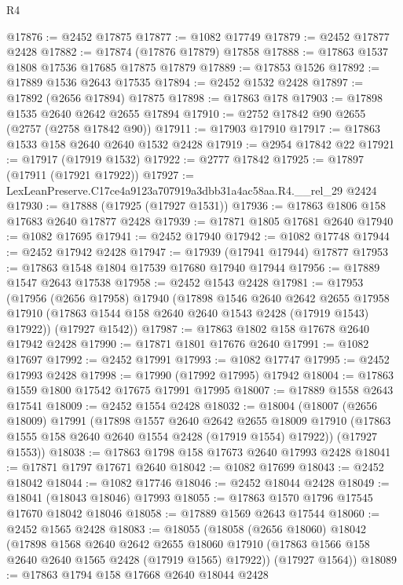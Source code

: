 \begin{lexlean}{R4}
\begin{coremodule}
@17876 := @2452 @17875
@17877 := @1082 @17749
@17879 := @2452 @17877 @2428
@17882 := @17874 (@17876 @17879) @17858
@17888 := @17863 @1537 @1808 @17536 @17685 @17875 @17879
@17889 := @17853 @1526
@17892 := @17889 @1536 @2643 @17535
@17894 := @2452 @1532 @2428
@17897 := @17892 (@2656 @17894) @17875
@17898 := @17863 @178
@17903 := @17898 @1535 @2640 @2642 @2655 @17894
@17910 := @2752 @17842 @90 @2655 (@2757 (@2758 @17842 @90))
@17911 := @17903 @17910
@17917 := @17863 @1533 @158 @2640 @2640 @1532 @2428
@17919 := @2954 @17842 @22
@17921 := @17917 (@17919 @1532)
@17922 := @2777 @17842
@17925 := @17897 (@17911 (@17921 @17922))
@17927 := LexLeanPreserve.C17ce4a9123a707919a3dbb31a4ac58aa.R4.__rel_29 @2424
@17930 := @17888 (@17925 (@17927 @1531))
@17936 := @17863 @1806 @158 @17683 @2640 @17877 @2428
@17939 := @17871 @1805 @17681 @2640
@17940 := @1082 @17695
@17941 := @2452 @17940
@17942 := @1082 @17748
@17944 := @2452 @17942 @2428
@17947 := @17939 (@17941 @17944) @17877
@17953 := @17863 @1548 @1804 @17539 @17680 @17940 @17944
@17956 := @17889 @1547 @2643 @17538
@17958 := @2452 @1543 @2428
@17981 := @17953
    (@17956
      (@2656 @17958)
      @17940
      (@17898
        @1546
        @2640
        @2642
        @2655
        @17958
        @17910
        (@17863 @1544 @158 @2640 @2640 @1543 @2428 (@17919 @1543) @17922))
      (@17927 @1542))
@17987 := @17863 @1802 @158 @17678 @2640 @17942 @2428
@17990 := @17871 @1801 @17676 @2640
@17991 := @1082 @17697
@17992 := @2452 @17991
@17993 := @1082 @17747
@17995 := @2452 @17993 @2428
@17998 := @17990 (@17992 @17995) @17942
@18004 := @17863 @1559 @1800 @17542 @17675 @17991 @17995
@18007 := @17889 @1558 @2643 @17541
@18009 := @2452 @1554 @2428
@18032 := @18004
    (@18007
      (@2656 @18009)
      @17991
      (@17898
        @1557
        @2640
        @2642
        @2655
        @18009
        @17910
        (@17863 @1555 @158 @2640 @2640 @1554 @2428 (@17919 @1554) @17922))
      (@17927 @1553))
@18038 := @17863 @1798 @158 @17673 @2640 @17993 @2428
@18041 := @17871 @1797 @17671 @2640
@18042 := @1082 @17699
@18043 := @2452 @18042
@18044 := @1082 @17746
@18046 := @2452 @18044 @2428
@18049 := @18041 (@18043 @18046) @17993
@18055 := @17863 @1570 @1796 @17545 @17670 @18042 @18046
@18058 := @17889 @1569 @2643 @17544
@18060 := @2452 @1565 @2428
@18083 := @18055
    (@18058
      (@2656 @18060)
      @18042
      (@17898
        @1568
        @2640
        @2642
        @2655
        @18060
        @17910
        (@17863 @1566 @158 @2640 @2640 @1565 @2428 (@17919 @1565) @17922))
      (@17927 @1564))
@18089 := @17863 @1794 @158 @17668 @2640 @18044 @2428

\end{coremodule}
\end{lexlean}
